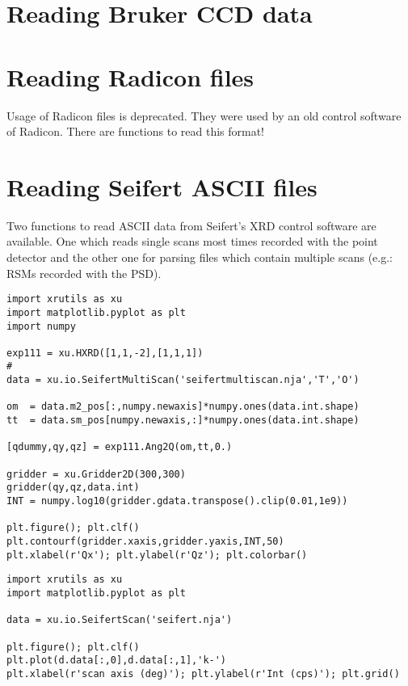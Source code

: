 \section{Reading Bruker CCD data}

\section{Reading Radicon files}

Usage of Radicon files is deprecated. They were used by an old control software of Radicon. There are functions to read this format!

\section{Reading Seifert ASCII files}

Two functions to read ASCII data from Seifert's XRD control software are available. One which reads single scans most times recorded with the point detector and the other one for parsing files which contain multiple scans (e.g.: RSMs recorded with the PSD).

\begin{lstlisting}[caption=script to parse and plot a reciprocal space map recorded with Seifert's XRD control software]
import xrutils as xu
import matplotlib.pyplot as plt
import numpy

exp111 = xu.HXRD([1,1,-2],[1,1,1])
# 
data = xu.io.SeifertMultiScan('seifertmultiscan.nja','T','O')

om  = data.m2_pos[:,numpy.newaxis]*numpy.ones(data.int.shape)
tt  = data.sm_pos[numpy.newaxis,:]*numpy.ones(data.int.shape)

[qdummy,qy,qz] = exp111.Ang2Q(om,tt,0.)

gridder = xu.Gridder2D(300,300)
gridder(qy,qz,data.int)
INT = numpy.log10(gridder.gdata.transpose().clip(0.01,1e9))

plt.figure(); plt.clf()
plt.contourf(gridder.xaxis,gridder.yaxis,INT,50)
plt.xlabel(r'Qx'); plt.ylabel(r'Qz'); plt.colorbar()
\end{lstlisting}

\begin{lstlisting}[caption=script to parse and plot a single scan recorded with Seifert's XRD control software]
import xrutils as xu
import matplotlib.pyplot as plt

data = xu.io.SeifertScan('seifert.nja')

plt.figure(); plt.clf()
plt.plot(d.data[:,0],d.data[:,1],'k-')
plt.xlabel(r'scan axis (deg)'); plt.ylabel(r'Int (cps)'); plt.grid()
\end{lstlisting}
